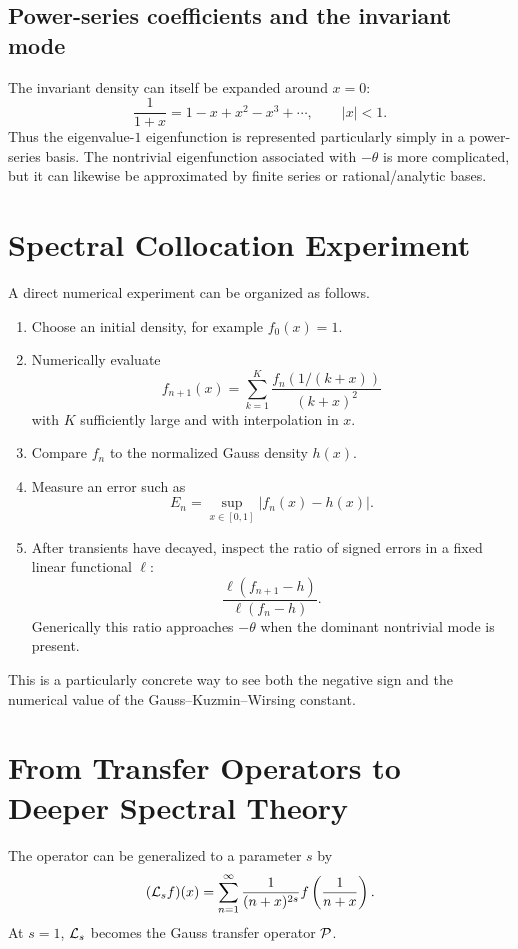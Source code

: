 \documentclass[a4paper]{article}
\begin{document}
\subsection{Power-series coefficients and the invariant mode}
The invariant density can itself be expanded around $x=0$:
\begin{equation}
 \frac1{1+x}=1-x+x^2-x^3+\cdots,
 \qquad |x|<1.
\end{equation}
Thus the eigenvalue-$1$ eigenfunction is represented particularly simply in a power-series basis. The nontrivial eigenfunction associated with $-\theta$ is more complicated, but it can likewise be approximated by finite series or rational/analytic bases.

\section{Spectral Collocation Experiment}
A direct numerical experiment can be organized as follows.
\begin{enumerate}[label=\arabic*.]
\item Choose an initial density, for example $f_0(x)=1$.
\item Numerically evaluate
\begin{equation}
 f_{n+1}(x)=\sum_{k=1}^{K}\frac{f_n(1/(k+x))}{(k+x)^2}
\end{equation}
with $K$ sufficiently large and with interpolation in $x$.
\item Compare $f_n$ to the normalized Gauss density $h(x)$.
\item Measure an error such as
\begin{equation}
 E_n=\sup_{x\in[0,1]}|f_n(x)-h(x)|.
\end{equation}
\item After transients have decayed, inspect the ratio of signed errors in a fixed linear functional $\ell$:
\begin{equation}
 \frac{\ell(f_{n+1}-h)}{\ell(f_n-h)}.
\end{equation}
Generically this ratio approaches $-\theta$ when the dominant nontrivial mode is present.
\end{enumerate}
This is a particularly concrete way to see both the negative sign and the numerical value of the Gauss--Kuzmin--Wirsing constant.

\section{From Transfer Operators to Deeper Spectral Theory}
The operator can be generalized to a parameter $s$ by
\begin{equation}
 (\mathcal{L}_s f)(x)=\sum_{n=1}^{\infty}\frac1{(n+x)^{2s}}
 f\left(\frac1{n+x}\right).
\end{equation}
At $s=1$, $\mathcal{L}_s$ becomes the Gauss transfer operator $\mathcal{P}$.
\end{document}
